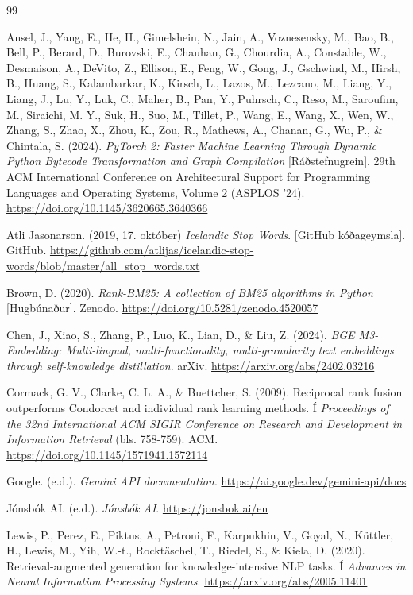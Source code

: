 \documentclass[fleqn]{report}
\begin{document}
\newpage

\begin{thebibliography}{99}
   
Ansel, J., Yang, E., He, H., Gimelshein, N., Jain, A., Voznesensky, M., Bao, B., Bell, P., Berard, D., Burovski, E., Chauhan, G., Chourdia, A., Constable, W., Desmaison, A., DeVito, Z., Ellison, E., Feng, W., Gong, J., Gschwind, M., Hirsh, B., Huang, S., Kalambarkar, K., Kirsch, L., Lazos, M., Lezcano, M., Liang, Y., Liang, J., Lu, Y., Luk, C., Maher, B., Pan, Y., Puhrsch, C., Reso, M., Saroufim, M., Siraichi, M. Y., Suk, H., Suo, M., Tillet, P., Wang, E., Wang, X., Wen, W., Zhang, S., Zhao, X., Zhou, K., Zou, R., Mathews, A., Chanan, G., Wu, P., \& Chintala, S. (2024). \textit{PyTorch 2: Faster Machine Learning Through Dynamic Python Bytecode Transformation and Graph Compilation} [Ráðstefnugrein]. 29th ACM International Conference on Architectural Support for Programming Languages and Operating Systems, Volume 2 (ASPLOS '24). \url{https://doi.org/10.1145/3620665.3640366}

Atli Jasonarson. (2019, 17. október) \textit{Icelandic Stop Words}. [GitHub kóðageymsla]. GitHub. \url{https://github.com/atlijas/icelandic-stop-words/blob/master/all_stop_words.txt}

Brown, D. (2020). \textit{Rank-BM25: A collection of BM25 algorithms in Python} [Hugbúnaður]. Zenodo. \url{https://doi.org/10.5281/zenodo.4520057}

Chen, J., Xiao, S., Zhang, P., Luo, K., Lian, D., \& Liu, Z. (2024). \textit{BGE M3-Embedding: Multi-lingual, multi-functionality, multi-granularity text embeddings through self-knowledge distillation}. arXiv. \url{https://arxiv.org/abs/2402.03216}

Cormack, G. V., Clarke, C. L. A., \& Buettcher, S. (2009). Reciprocal rank fusion outperforms Condorcet and individual rank learning methods. Í \textit{Proceedings of the 32nd International ACM SIGIR Conference on Research and Development in Information Retrieval} (bls. 758-759). ACM. \url{https://doi.org/10.1145/1571941.1572114}

Google. (e.d.). \textit{Gemini API documentation}. \url{https://ai.google.dev/gemini-api/docs}

Jónsbók AI. (e.d.). \textit{Jónsbók AI}. \url{https://jonsbok.ai/en}

Lewis, P., Perez, E., Piktus, A., Petroni, F., Karpukhin, V., Goyal, N., Küttler, H., Lewis, M., Yih, W.-t., Rocktäschel, T., Riedel, S., \& Kiela, D. (2020). Retrieval-augmented generation for knowledge-intensive NLP tasks. Í \textit{Advances in Neural Information Processing Systems}. \url{https://arxiv.org/abs/2005.11401}


\end{thebibliography}
\end{document}

